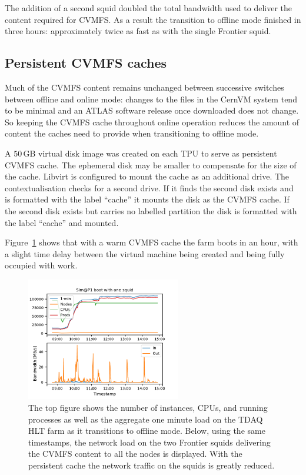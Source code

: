 \documentclass{webofc}
\begin{document}
The addition of a second squid doubled the total bandwidth used to deliver the
content required for CVMFS. As a result the transition to offline mode finished
in three hours: approximately twice as fast as with the single Frontier squid.


\subsection{Persistent CVMFS caches}
\label{sec:cvmfs}
Much of the CVMFS content remains unchanged between successive switches between
offline and online mode: changes to the files in the CernVM system tend to be
minimal and an ATLAS software release once downloaded does not change. So
keeping the CVMFS cache throughout online operation reduces the
amount of content the caches need to provide when transitioning to offline mode.

A $50$\,\textrm{GB} virtual disk image was created on each TPU to serve as
persistent CVMFS cache. The ephemeral disk may be smaller to
compensate for the size of the cache. Libvirt is configured to mount the cache
as an additional drive. The contextualisation checks for a second drive. If it
finds the second disk exists and is formatted with the label ``cache'' it
mounts the disk as the CVMFS cache. If the second disk exists but carries no
labelled partition the disk is formatted with the label ``cache'' and mounted.

Figure~\ref{fig:persistent_cache} shows that with a warm CVMFS cache the farm
boots in an hour, with a slight time delay between the virtual machine being
created and being fully occupied with work.
\begin{figure}[h]
\centering
\sidecaption
\includegraphics[width=0.6\textwidth,clip]{persistent_cache}
\caption{The top figure shows the number of instances, CPUs, and running
processes as well as the aggregate one minute load on the TDAQ HLT farm as it
transitions to offline mode. Below, using the same timestamps, the network load
on the two Frontier squids delivering the CVMFS content to all the nodes is
displayed. With the persistent cache the network traffic on the squids
is greatly reduced.}
\label{fig:persistent_cache}
\end{figure}
\end{document}
